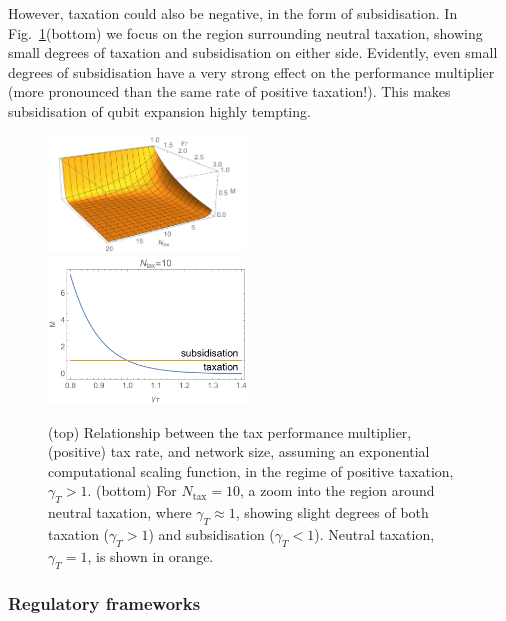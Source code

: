 However, taxation could also be negative, in the form of subsidisation. In Fig.~\ref{fig:tax_exp}(bottom) we focus on the region surrounding neutral taxation, showing small degrees of taxation and subsidisation on either side. Evidently, even small degrees of subsidisation have a very strong effect on the performance multiplier (more pronounced than the same rate of positive taxation!). This makes subsidisation of qubit expansion highly tempting.

\begin{figure}[!htb]
\includegraphics[width=0.47\textwidth]{tax_exp} \\
\includegraphics[width=0.47\textwidth]{tax_subsidy}
\caption{(top) Relationship between the tax performance multiplier, (positive) tax rate, and network size, assuming an exponential computational scaling function, in the regime of positive taxation, \mbox{$\gamma_T>1$}. (bottom) For \mbox{$N_\text{tax}=10$}, a zoom into the region around neutral taxation, where \mbox{$\gamma_T\approx 1$}, showing slight degrees of both taxation (\mbox{$\gamma_T>1$}) and subsidisation (\mbox{$\gamma_T<1$}). Neutral taxation, \mbox{$\gamma_T=1$}, is shown in orange.}\label{fig:tax_exp}
\end{figure}

%
%

\subsubsection{Regulatory frameworks} 


